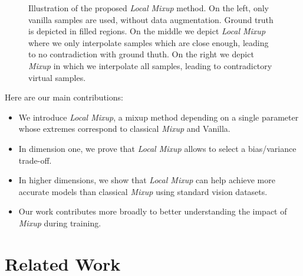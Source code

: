 \documentclass[twoside]{article}
\numberwithin{intassumption}{assumption}
\begin{document}
\begin{figure*}
\vspace{-2.2cm}
    \caption{Illustration of the proposed \emph{Local Mixup} method. On the left, only vanilla samples are used, without data augmentation. Ground truth is depicted in filled regions. On the middle we depict \emph{Local Mixup} where we only interpolate samples which are close enough, leading to no contradiction with ground thuth. On the right we depict \emph{Mixup} in which we interpolate all samples, leading to contradictory virtual samples.}
    \label{fig:method}
    \vspace{-0.1cm}
\end{figure*}

Here are our main contributions:
\begin{itemize}[noitemsep,topsep=0pt]
    \item We introduce \emph{Local Mixup}, a mixup method depending on a single parameter whose extremes correspond to classical \emph{Mixup} and Vanilla.
    \item In dimension one, we prove that \emph{Local Mixup} allows to select a bias/variance trade-off.
    \item In higher dimensions, we show that \emph{Local Mixup} can help achieve more accurate models than classical \emph{Mixup} using standard vision datasets.
    \item Our work contributes more broadly to better understanding the impact of \emph{Mixup} during training.
\end{itemize}

\section{Related Work}
\end{document}
